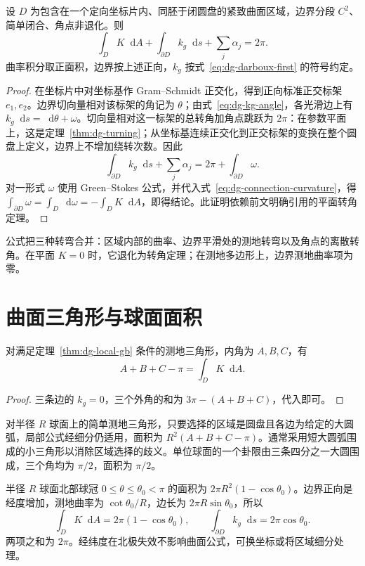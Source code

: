 \documentclass[UTF8,12pt,a4paper,fontset=fandol]{ctexbook}
\newcommand{\dd}{\mathop{}\!\mathrm d}
\begin{document}
\begin{theorem}
设 $D$ 为包含在一个定向坐标片内、同胚于闭圆盘的紧致曲面区域，边界分段 $C^2$、简单闭合、角点非退化。则
\begin{equation}
 \int_D K\dd A+\int_{\partial D}k_g\dd s+\sum_j\alpha_j=2\pi.
 \label{eq:dg-local-gb}
\end{equation}
曲率积分取正面积，边界按上述正向，$k_g$ 按式~\eqref{eq:dg-darboux-first} 的符号约定。
\label{thm:dg-local-gb}
\end{theorem}
\begin{proof}
在坐标片中对坐标基作 Gram--Schmidt 正交化，得到正向标准正交标架 $e_1,e_2$。边界切向量相对该标架的角记为 $\theta$；由式~\eqref{eq:dg-kg-angle}，各光滑边上有 $k_g\dd s=\dd\theta+\omega$。切向量相对这一标架的总转角加角点跳跃为 $2\pi$：在参数平面上，这是定理~\ref{thm:dg-turning}；从坐标基连续正交化到正交标架的变换在整个圆盘上定义，边界上不增加绕转次数。因此
\[
 \int_{\partial D}k_g\dd s+\sum_j\alpha_j
 =2\pi+\int_{\partial D}\omega.
\]
对一形式 $\omega$ 使用 Green--Stokes 公式，并代入式~\eqref{eq:dg-connection-curvature}，得 $\int_{\partial D}\omega=\int_D\dd\omega=-\int_DK\dd A$，即得结论。此证明依赖前文明确引用的平面转角定理。
\end{proof}
公式把三种转弯合并：区域内部的曲率、边界平滑处的测地转弯以及角点的离散转角。在平面 $K=0$ 时，它退化为转角定理；在测地多边形上，边界测地曲率项为零。

\section{曲面三角形与球面面积}
\begin{corollary}[测地三角形的角盈]
对满足定理~\ref{thm:dg-local-gb} 条件的测地三角形，内角为 $A,B,C$，有
\begin{equation}
 A+B+C-\pi=\int_DK\dd A.
 \label{eq:dg-angle-excess}
\end{equation}
\end{corollary}
\begin{proof}
三条边的 $k_g=0$，三个外角的和为 $3\pi-(A+B+C)$，代入即可。
\end{proof}
对半径 $R$ 球面上的简单测地三角形，只要选择的区域是圆盘且各边为给定的大圆弧，局部公式经细分仍适用，面积为 $R^2(A+B+C-\pi)$。通常采用短大圆弧围成的小三角形以消除区域选择的歧义。单位球面的一个卦限由三条四分之一大圆围成，三个角均为 $\pi/2$，面积为 $\pi/2$。

\begin{example}[球冠的边界曲率核对]
半径 $R$ 球面北部球冠 $0\le\theta\le\theta_0<\pi$ 的面积为 $2\pi R^2(1-\cos\theta_0)$。边界正向是经度增加，测地曲率为 $\cot\theta_0/R$，边长为 $2\pi R\sin\theta_0$，所以
\[
 \int_DK\dd A=2\pi(1-\cos\theta_0),\qquad
 \int_{\partial D}k_g\dd s=2\pi\cos\theta_0.
\]
两项之和为 $2\pi$。经纬度在北极失效不影响曲面公式，可换坐标或将区域细分处理。
\end{example}
\end{document}
